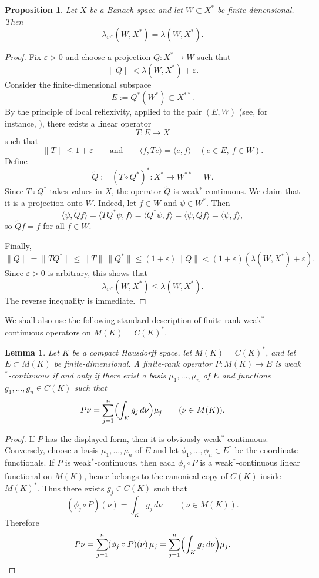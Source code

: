 \documentclass[11pt]{amsart}
\numberwithin{equation}{section}
\newtheorem{lemma}[theorem]{Lemma}
\newtheorem{proposition}[theorem]{Proposition}
\theoremstyle{definition}
\theoremstyle{remark}
\newcommand{\wstar}{w^*}
\begin{document}
\begin{proposition}
\label{prop:wstar-equals-lambda}
Let $X$ be a Banach space and let $W\subset X^*$ be finite-dimensional. Then
\[
\lambda_{\wstar}(W,X^*)=\lambda(W,X^*).
\]
\end{proposition}

\begin{proof}
Fix $\varepsilon>0$ and choose a projection $Q\colon X^*\to W$ such that
\[
\|Q\|<\lambda(W,X^*)+\varepsilon.
\]
Consider the finite-dimensional subspace
\[
E:=Q^*(W^*)\subset X^{**}.
\]
By the principle of local reflexivity, applied to the pair $(E,W)$ (see, for instance, \cite[Theorem~11.2.4]{AK}), there exists a linear operator
\[
T\colon E\to X
\]
such that
\[
\|T\|\leqslant 1+\varepsilon
\qquad\text{and}\qquad
\langle f,Te\rangle = \langle e,f\rangle
\quad (e\in E,\ f\in W).
\]
Define
\[
\widetilde Q := (T\circ Q^*)^*\colon X^*\to W^{**}=W.
\]
Since $T\circ Q^*$ takes values in $X$, the operator $\widetilde Q$ is weak$^*$-continuous. We claim that it is a projection onto $W$. Indeed, let $f\in W$ and $\psi\in W^*$. Then
\[
\langle \psi,\widetilde Q f\rangle
= \langle TQ^*\psi,f\rangle
= \langle Q^*\psi,f\rangle
= \langle \psi,Qf\rangle
= \langle \psi,f\rangle,
\]
so $\widetilde Qf=f$ for all $f\in W$.

Finally,
\[
\|\widetilde Q\| = \|TQ^*\| \leqslant \|T\|\,\|Q^*\| \leqslant (1+\varepsilon)\|Q\|
< (1+\varepsilon)(\lambda(W,X^*)+\varepsilon).
\]
Since $\varepsilon>0$ is arbitrary, this shows that
\[
\lambda_{\wstar}(W,X^*)\leqslant \lambda(W,X^*).
\]
The reverse inequality is immediate.
\end{proof}

We shall also use the following standard description of finite-rank weak$^*$-continuous operators on $M(K)=C(K)^*$.

\begin{lemma}
\label{lem:wstar-coded}
Let $K$ be a compact Hausdorff space, let $M(K)=C(K)^*$, and let $E\subset M(K)$ be finite-dimensional. A finite-rank operator $P\colon M(K)\to E$ is weak$^*$-continuous if and only if there exist a basis $\mu_1,\dots,\mu_n$ of $E$ and functions $g_1,\dots,g_n\in C(K)$ such that
\[
P\nu = \sum_{j=1}^n \Bigl(\int_K g_j\, d\nu\Bigr)\mu_j
\qquad (\nu\in M(K)).
\]
\end{lemma}

\begin{proof}
If $P$ has the displayed form, then it is obviously weak$^*$-continuous. Conversely, choose a basis $\mu_1,\dots,\mu_n$ of $E$ and let $\phi_1,\dots,\phi_n\in E^*$ be the coordinate functionals. If $P$ is weak$^*$-continuous, then each $\phi_j\circ P$ is a weak$^*$-continuous linear functional on $M(K)$, hence belongs to the canonical copy of $C(K)$ inside $M(K)^*$. Thus there exists $g_j\in C(K)$ such that
\[
(\phi_j\circ P)(\nu)=\int_K g_j\,d\nu
\qquad (\nu\in M(K)).
\]
Therefore
\[
P\nu = \sum_{j=1}^n (\phi_j\circ P)(\nu)\,\mu_j
= \sum_{j=1}^n \Bigl(\int_K g_j\, d\nu\Bigr)\mu_j.
\qedhere
\]
\end{proof}
\end{document}
